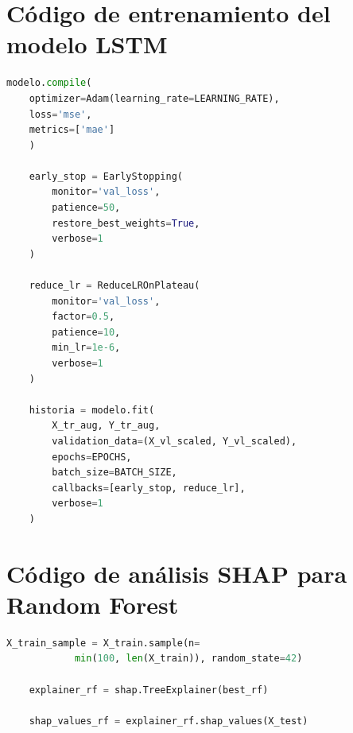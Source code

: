\section{Código de entrenamiento del modelo LSTM}
\label{sec:codigo_entrenamiento_lstm}
\begin{lstlisting}[language=Python, caption=Compilación y entrenamiento del modelo LSTM, label=lst:model_training]
    modelo.compile(
    optimizer=Adam(learning_rate=LEARNING_RATE),
    loss='mse',
    metrics=['mae']
    ) 

    early_stop = EarlyStopping(
        monitor='val_loss',
        patience=50,
        restore_best_weights=True,
        verbose=1
    )

    reduce_lr = ReduceLROnPlateau(
        monitor='val_loss',
        factor=0.5,
        patience=10,
        min_lr=1e-6,
        verbose=1
    ) 

    historia = modelo.fit(
        X_tr_aug, Y_tr_aug, 
        validation_data=(X_vl_scaled, Y_vl_scaled),
        epochs=EPOCHS,
        batch_size=BATCH_SIZE,
        callbacks=[early_stop, reduce_lr],
        verbose=1
    ) 
\end{lstlisting}

\section{Código de análisis SHAP para Random Forest}
\label{sec:codigo_shap}
\begin{lstlisting}[language=Python, caption=Implementación de TreeExplainer en Randon Forest, label=lst:tree_explainer]
    X_train_sample = X_train.sample(n=
            min(100, len(X_train)), random_state=42)

    explainer_rf = shap.TreeExplainer(best_rf)

    shap_values_rf = explainer_rf.shap_values(X_test)
\end{lstlisting}
